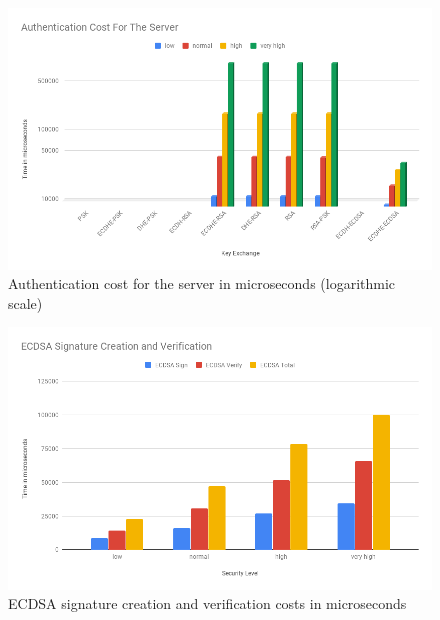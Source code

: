 				  \begin{figure}
					\centering
					\includegraphics[width=1.0\textwidth]{img/papi-server-auth-cost.png}
					\centering \caption{Authentication cost for the server in microseconds (logarithmic scale)}
					\label{af:2}
				  \end{figure}
  
				  \begin{figure}
					\centering
					\includegraphics[width=1.0\textwidth]{img/papi-ecdsa-sign-verify.png}
					\centering \caption{ECDSA signature creation and verification costs in microseconds}
					\label{af:3}
				  \end{figure}
  
